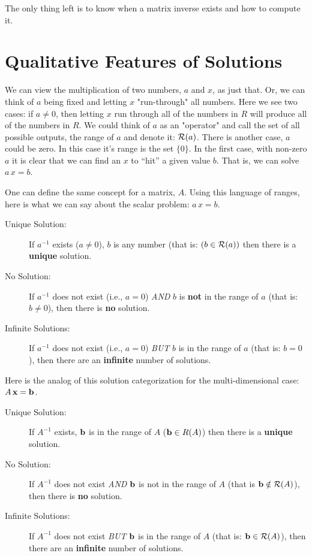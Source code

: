 \documentclass{article}
\begin{document}
The only thing left is to know when a matrix inverse exists and how to compute it.


\section{Qualitative Features of Solutions}
We can view the multiplication of two numbers, $a$ and $x$, as just that.
Or, we can think of $a$ being fixed and letting $x$ "run-through" all 
numbers. Here we see two cases: if $a \neq 0$, then letting $x$ run
through all of the numbers in $R$ will produce all of the numbers in $R$.
We could think of $a$ as an "operator" and call the set of all possible 
outputs, the range of $a$ and denote it: ${\cal R}(a)$.
There is another case, $a$ could be zero. In this case it's range is the
set $\{0\}$. In the first case, with non-zero $a$ it is clear that we can
find an $x$ to ``hit'' a given value $b$. That is, we can solve $a\, x = b$.

One can define the same concept for a matrix, $A$. Using this language
of ranges, here is what we can say about the scalar problem: $a \, x = b$.
\begin{description}
    \item[Unique Solution:]{If $a^{-1}$ exists ($a \neq 0$), $b$ is any number (that is: $(b \in {\cal R}(a))$}
		then there is a {\bf unique\/} solution.
\item[No Solution:]{If $a^{-1}$ does not exist (i.e., $a = 0$) {\em AND\/}
	$b$ is {\bf not\/} in the range of $a$ (that is: $b \ne 0$), then there is {\bf no\/} solution.}
\item[Infinite Solutions:]{If $a^{-1}$ does not exist (i.e., $a = 0$) {\em BUT\/}
	$b$ is in the range of $a$ (that is: $b = 0$), 
	then there are an {\bf infinite\/} number of solutions.}
\end{description}

Here is the analog of this solution categorization for the multi-dimensional case: $A \, {\bf x} = {\bf b}$.
\begin{description}
	\item[Unique Solution:]{If $A^{-1}$ exists, ${\bf b\/}$ is in the range of $A$ (${\bf b} \in R(A)$)
		then there is a {\bf unique\/} solution.}
\item[No Solution:]{If $A^{-1}$ does not exist {\em AND\/}
	${\bf b\/}$ is not in the range of $A$ (that is ${\bf b} \notin {\cal R}(A)$),
then there is {\bf no\/} solution.}  
\item[Infinite Solutions:]{If $A^{-1}$ does not exist {\em BUT\/}
		${\bf b\/}$ is in the range of $A$ (that is: ${\bf b} \in {\cal R}(A)$),
then there are an {\bf infinite\/} number of solutions.} 
\end{description}
\end{document}
